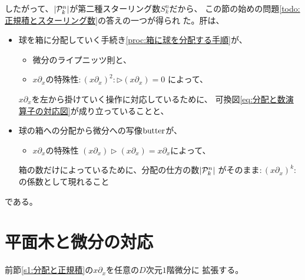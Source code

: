 	したがって、$\left|{{\mathcal{P}}_k^n}\right|$が第二種スターリング数$S_k^n$だから、
	この節の始めの問題\ref{todo:正規積とスターリング数}の答えの一つが得られ
	た。肝は、
	\begin{itemize}\setlength{\itemsep}{-1mm} %
		\item 球を箱に分配していく手続き\ref{proc:箱に球を分配する手順}が、
		\begin{itemize}\setlength{\itemsep}{-1mm} %
			\item 微分のライプニッツ則と、
			\item $x\partial_x$の特殊性$:(x\partial_x)^2:\rhd(x\partial_x)=0$
			によって、
		\end{itemize} %
		$x\partial_x$を左から掛けていく操作に対応しているために、
		可換図\eqref{eq:分配と数演算子の対応図}が成り立っていることと、
		\item 球の箱への分配から微分への写像$\operatorname{butter}$が、
		\begin{itemize}\setlength{\itemsep}{-1mm} %
			\item $x\partial_x$の特殊性
			$(x\partial_x)\rhd(x\partial_x)=x\partial_x$によって、
		\end{itemize} %
		箱の数だけによっているために、分配の仕方の数$\left|{{\mathcal{P}}_k^n}\right|$
		がそのまま$:(x\partial_x)^k:$の係数として現れること
	\end{itemize} %
	である。

\section{平面木と微分の対応}\label{s1:平面木と微分の対応} %
	前節\ref{s1:分配と正規積}の$x\partial_x$を任意の$D$次元$1$階微分に
	拡張する。

